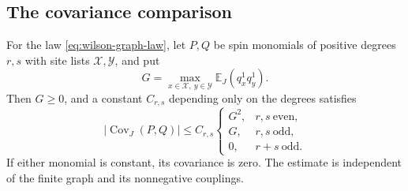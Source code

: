 \subsection{The covariance comparison}

\begin{proposition}
\label{prop:wilson-covariance}
For the law \eqref{eq:wilson-graph-law}, let $P,Q$ be spin monomials
of positive degrees $r,s$ with site lists $\mathcal X,\mathcal Y$,
and put
\[
 G=\max_{x\in\mathcal X,\ y\in\mathcal Y}\mathbb E_J(q_x^1q_y^1).
\]
Then $G\ge0$, and a constant $C_{r,s}$ depending only on the degrees
satisfies
\begin{equation}
 |\operatorname{Cov}_J(P,Q)|\le C_{r,s}
 \begin{cases}
  G^2,&r,s\ \text{even},\\
  G,&r,s\ \text{odd},\\
  0,&r+s\ \text{odd}.
 \end{cases}
 \label{eq:sector-cov}
\end{equation}
If either monomial is constant, its covariance is zero. The estimate
is independent of the finite graph and its nonnegative couplings.
\end{proposition}

